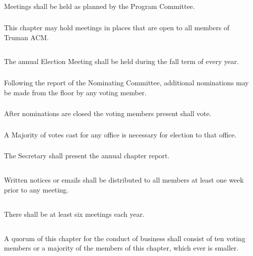 \documentclass[12pt]{article}
\begin{document}
\subsection{}	Meetings shall be held as planned by the Program Committee.
\subsubsection{}	This chapter may hold meetings in places that are open to all members of Truman ACM.
\subsection{}	The annual Election Meeting shall be held during the fall term of every year.
\subsubsection{}	Following the report of the Nominating Committee, additional nominations may be made from the floor by any voting member.
\subsubsection{}	After nominations are closed the voting members present shall vote.
\subsubsection{}	A Majority of votes cast for any office is necessary for election to that office.
\subsubsection{}	The Secretary shall present the annual chapter report.
\subsection{}	Written notices or emails shall be distributed to all members at least one week prior to any meeting.
\subsection{}	There shall be at least six meetings each year.
\subsection{}	A quorum of this chapter for the conduct of business shall consist of ten voting members or a majority of the members of this chapter, which ever is smaller.
\end{document}
